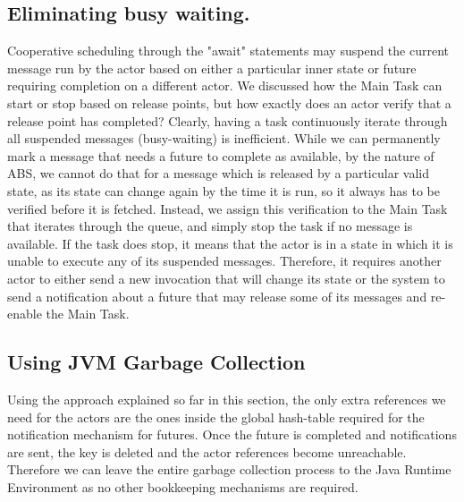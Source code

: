 
\subsection{Eliminating busy waiting.}
Cooperative scheduling through the "await" statements may suspend the current message run by the actor based on either a particular inner state or future requiring completion on a different actor. We discussed how the Main Task can start or stop based on release points, but how exactly does an actor verify that a release point has completed? Clearly, having a task continuously iterate through all suspended messages (busy-waiting) is inefficient. While we can permanently mark a message that needs a future to complete as available, by the nature of ABS, we cannot do that for a message which is released by a particular valid state, as its state can change again by the time it is run, so it always has to be verified before it is fetched. Instead, we assign this verification to the Main Task that iterates through the queue, and simply stop the task if no message is available. If the task does stop, it means that the actor is in a state in which it is unable to execute any of its suspended messages. Therefore, it requires another actor to either send a new invocation that will change its state or the system to send a notification about a future that may release some of its messages and re-enable the Main Task. 


\subsection{Using JVM Garbage Collection}
Using the approach explained so far in this section, the only extra references we need for the actors are the ones inside the global hash-table required for the notification mechanism for futures. Once the future is completed and notifications are sent, the key is deleted and the actor references become unreachable. Therefore we can leave the entire garbage collection process to the Java Runtime Environment as no other bookkeeping mechanisms are required.

